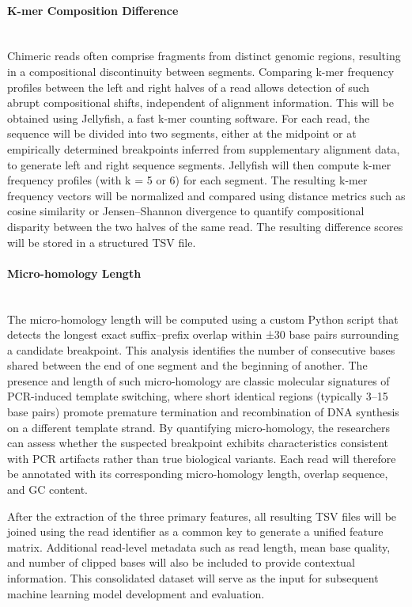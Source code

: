 \documentclass{article}
\begin{document}
\paragraph{K-mer Composition Difference}\hfill\\
Chimeric reads often comprise fragments from distinct genomic regions, resulting in a compositional discontinuity between segments. Comparing k-mer frequency profiles between the left and right halves of a read allows detection of such abrupt compositional shifts, independent of alignment information. This will be obtained using Jellyfish, a fast k-mer counting software. For each read, the sequence will be divided into two segments, either at the midpoint or at empirically determined breakpoints inferred from supplementary alignment data, to generate left and right sequence segments. Jellyfish will then compute k-mer frequency profiles (with k = 5 or 6) for each segment. The resulting k-mer frequency vectors will be normalized and compared using distance metrics such as cosine similarity or Jensen–Shannon divergence to quantify compositional disparity between the two halves of the same read. The resulting difference scores will be stored in a structured TSV file.

\paragraph{Micro-homology Length}\hfill\\
The micro-homology length will be computed using a custom Python script that detects the longest exact suffix–prefix overlap within ±30 base pairs surrounding a candidate breakpoint. This analysis identifies the number of consecutive bases shared between the end of one segment and the beginning of another. The presence and length of such micro-homology are classic molecular signatures of PCR-induced template switching, where short identical regions (typically 3–15 base pairs) promote premature termination and recombination of DNA synthesis on a different template strand. By quantifying micro-homology, the researchers can assess whether the suspected breakpoint exhibits characteristics consistent with PCR artifacts rather than true biological variants. Each read will therefore be annotated with its corresponding micro-homology length, overlap sequence, and GC content.

After the extraction of the three primary features, all resulting TSV files will be joined using the read identifier as a common key to generate a unified feature matrix. Additional read-level metadata such as read length, mean base quality, and number of clipped bases will also be included to provide contextual information. This consolidated dataset will serve as the input for subsequent machine learning model development and evaluation.
\end{document}
